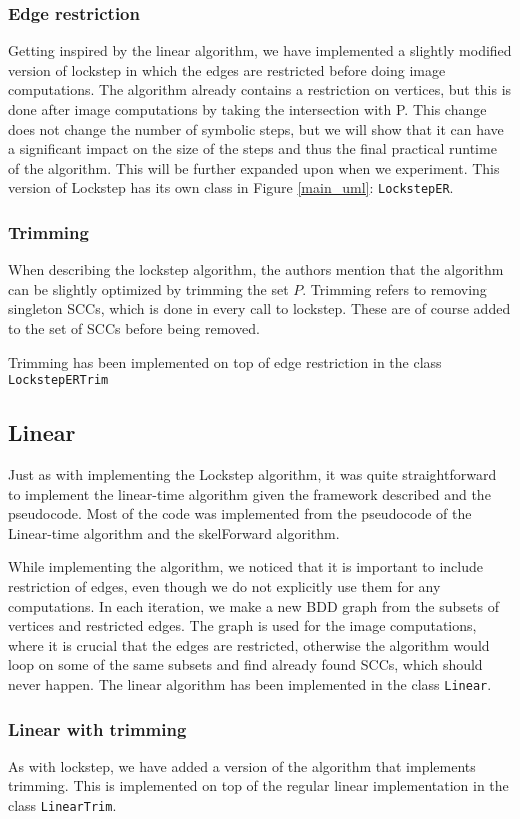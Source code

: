 \documentclass[../master/master.tex]{subfiles}
\begin{document}
\subsubsection{Edge restriction}
Getting inspired by the linear algorithm, we have implemented a slightly modified version of lockstep in which the edges are restricted before doing image computations. The algorithm already contains a restriction on vertices, but this is done after image computations by taking the intersection with P. This change does not change the number of symbolic steps, but we will show that it can have a significant impact on the size of the steps and thus the final practical runtime of the algorithm. This will be further expanded upon when we experiment. This version of Lockstep has its own class in Figure \ref{main_uml}: \texttt{LockstepER}.

\subsubsection{Trimming}
When describing the lockstep algorithm\cite{lockstep}, the authors mention that the algorithm can be slightly optimized by trimming the set $P$. Trimming refers to removing singleton SCCs, which is done in every call to lockstep. These are of course added to the set of SCCs before being removed.

Trimming has been implemented on top of edge restriction in the class 
\texttt{LockstepERTrim}

\subsection{Linear}
Just as with implementing the Lockstep algorithm, it was quite straightforward to implement the linear-time algorithm given the framework described and the pseudocode. Most of the code was implemented from the pseudocode of the Linear-time algorithm and the skelForward algorithm.

While implementing the algorithm, we noticed that it is important to include restriction of edges, even though we do not explicitly use them for any computations. In each iteration, we make a new BDD graph from the subsets of vertices and restricted edges. The graph is used for the image computations, where it is crucial that the edges are restricted, otherwise the algorithm would loop on some of the same subsets and find already found SCCs, which should never happen.
The linear algorithm has been implemented in the class \texttt{Linear}. 

\subsubsection{Linear with trimming}
As with lockstep, we have added a version of the algorithm that implements trimming. This is implemented on top of the regular linear implementation in the class \texttt{LinearTrim}.
\end{document}

